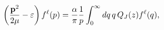\begin{equation}
\left( \frac{\mathbf{p}^{2}}{2\mu }-\varepsilon \right) f^{\ell }(p)=\frac{%
\alpha }{\pi }\frac{1}{p}\int_{0}^{\infty }dq\, q\, Q_{J}(z)f^{\ell }(q),
\end{equation}

